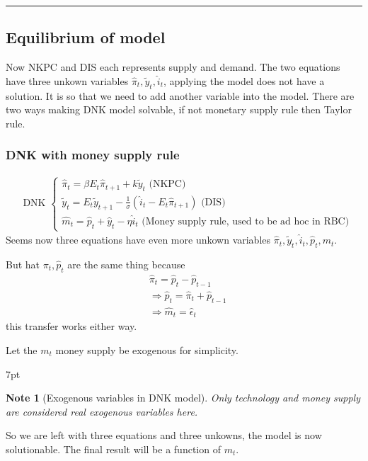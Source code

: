 \documentclass{article}
\newcommand*\sepline{%
  \begin{center}
    \rule[1ex]{.5\textwidth}{.5pt}
  \end{center}}
\newenvironment{blueblock}{
\def\FrameCommand{
  \hspace{1pt}
    {\color{DarkBlue}
    \vrule width 2pt}
    {\color{blueshade}
    \vrule width 4pt}
  \colorbox{blueshade}
}
\MakeFramed{
  \advance
  \hsize-
  \width
  \FrameRestore}
\noindent\hspace{-4.55pt}%
\begin{adjustwidth}{}{7pt}
\vspace{2pt}\vspace{2pt}
}
{\vspace{2pt}\end{adjustwidth}\endMakeFramed}
\newtheorem{note}{Note}
\begin{document}
\sepline
\subsection{Equilibrium of model}

Now NKPC and DIS each represents supply and demand. The two equations have three unkown variables $\hat \pi_t, \tilde y_t, \hat i_t$, applying the model does not have a solution. It is so that we need to add another variable into the model. There are two ways making DNK model solvable, if not monetary supply rule then Taylor rule.

\subsubsection{DNK with money supply rule}
\begin{align}
&\text{DNK } 
\begin{cases}
\hat \pi_t = \beta E_t \hat \pi_{t+1}+k \tilde y_t  \text{ (NKPC)}
\\
\tilde y_t=E_t \tilde y_{t+1} -\frac{1}{\sigma}(\hat i_t - E_t \hat \pi_{t+1}) \text{ (DIS)}
\\
\hat m_t=\hat p_t +\hat y_t - \eta \hat i_t
\text{ (Money supply rule, used to be ad hoc in RBC)}
\end{cases}
\end{align}
Seems now three equations have even more unkown variables $\hat \pi_t, \tilde y_t, \hat i_t, \hat p_t, m_t$.

But hat $\pi_t, \hat p_t$ are the same thing because
\begin{align}
& \hat \pi_t=\hat p_t -\hat p_{t-1}
\\& \Rightarrow  \hat p_t = \hat \pi_t + \hat p_{t-1}
\\& \Rightarrow \hat m_t = \hat \epsilon_t
\end{align}
this transfer works either way.

Let the $m_t$ money supply be exogenous for simplicity.

\begin{blueblock}
\begin{note}[Exogenous variables in DNK model]
Only technology and money supply are considered real exogenous variables here.
\end{note}
\end{blueblock}

So we are left with three equations and three unkowns, the model is now solutionable. The final result will be a function of $m_t$.
\end{document}
